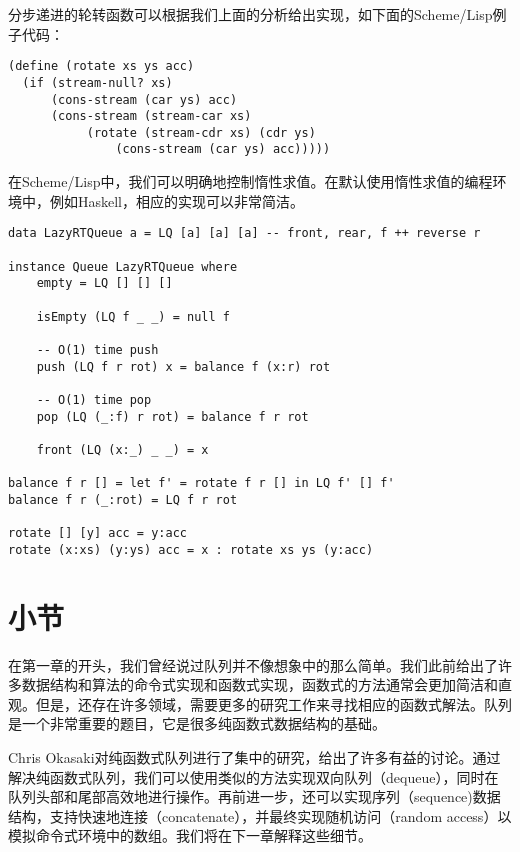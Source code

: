 \documentclass[UTF8]{article}
\begin{document}
分步递进的轮转函数可以根据我们上面的分析给出实现，如下面的Scheme/Lisp例子代码：

\begin{lstlisting}
(define (rotate xs ys acc)
  (if (stream-null? xs)
      (cons-stream (car ys) acc)
      (cons-stream (stream-car xs)
           (rotate (stream-cdr xs) (cdr ys)
               (cons-stream (car ys) acc)))))
\end{lstlisting}

在Scheme/Lisp中，我们可以明确地控制惰性求值。在默认使用惰性求值的编程环境中，例如Haskell，相应的实现可以非常简洁。

\lstset{language=Haskell}
\begin{lstlisting}[style=Haskell]
data LazyRTQueue a = LQ [a] [a] [a] -- front, rear, f ++ reverse r

instance Queue LazyRTQueue where
    empty = LQ [] [] []

    isEmpty (LQ f _ _) = null f

    -- O(1) time push
    push (LQ f r rot) x = balance f (x:r) rot

    -- O(1) time pop
    pop (LQ (_:f) r rot) = balance f r rot

    front (LQ (x:_) _ _) = x

balance f r [] = let f' = rotate f r [] in LQ f' [] f'
balance f r (_:rot) = LQ f r rot

rotate [] [y] acc = y:acc
rotate (x:xs) (y:ys) acc = x : rotate xs ys (y:acc)
\end{lstlisting}

\section{小节}

在第一章的开头，我们曾经说过队列并不像想象中的那么简单。我们此前给出了许多数据结构和算法的命令式实现和函数式实现，函数式的方法通常会更加简洁和直观。但是，还存在许多领域，需要更多的研究工作来寻找相应的函数式解法。队列是一个非常重要的题目，它是很多纯函数式数据结构的基础。

Chris Okasaki对纯函数式队列进行了集中的研究，给出了许多有益的讨论\cite{okasaki-book}。通过解决纯函数式队列，我们可以使用类似的方法实现双向队列（dequeue），同时在队列头部和尾部高效地进行操作。再前进一步，还可以实现序列（sequence)数据结构，支持快速地连接（concatenate），并最终实现随机访问（random access）以模拟命令式环境中的数组。我们将在下一章解释这些细节。
\end{document}
